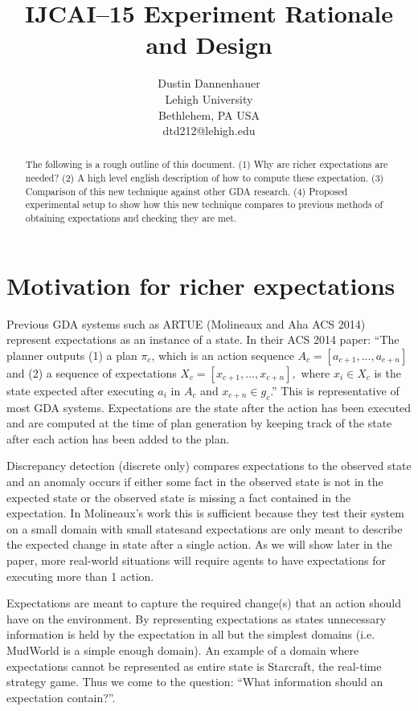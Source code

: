 \documentclass{article}
\title{IJCAI--15 Experiment Rationale and Design}
\author{Dustin Dannenhauer \\
Lehigh University\\
Bethlehem, PA USA \\
dtd212@lehigh.edu}
\begin{document}
\maketitle

\begin{abstract}
  The following is a rough outline of this document. (1) Why are richer expectations
  are needed? (2) A high level english description of how to compute
  these expectation. (3) Comparison of this new technique against other
  GDA research. (4) Proposed experimental setup to show how this new
  technique compares to previous methods of obtaining expectations and
  checking they are met.
\end{abstract}

\section{Motivation for richer expectations}
Previous GDA systems such as ARTUE (Molineaux and Aha ACS 2014)
represent expectations as an instance of a state. In their ACS 2014
paper: ``The planner outputs (1) a plan $\pi_c$, which is an action
sequence $A_c = [a_{c+1},..., a_{c+n}]$ and (2) a sequence of
expectations $X_c = [x_{c+1},..., x_{c+n}],$ where $x_i \in X_c$ is
the state expected after executing $a_i$ in $A_c$ and $x_{c+n} \in
g_c$.'' This is representative of most GDA
systems\footnotemark[1]. Expectations are the state after the action
has been executed and are computed at the time of plan generation by
keeping track of the state after each action has been added to the
plan.

Discrepancy detection (discrete only) compares expectations to the
observed state and an anomaly occurs if either some fact in the
observed state is not in the expected state or the observed state is
missing a fact contained in the expectation. In Molineaux's work this
is sufficient because they test their system on a small domain with
small states\footnotemark[2] and expectations are only meant to
describe the expected change in state after a single action. As we
will show later in the paper, more real-world situations will require
agents to have expectations for executing more than 1 action.

Expectations are meant to capture the required change(s) that an
action should have on the environment. By representing expectations as
states unnecessary information is held by the expectation in all but
the simplest domains (i.e. MudWorld is a simple enough domain). An
example of a domain where expectations cannot be represented as entire
state is Starcraft, the real-time strategy game\footnotemark[3]. Thus
we come to the question: ``What information should an expectation
contain?''. 
\end{document}
